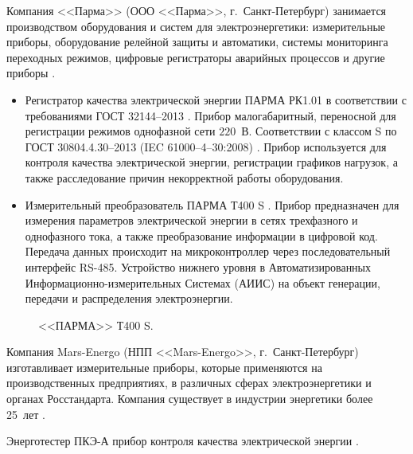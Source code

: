 Компания <<Парма>> (ООО <<Парма>>, г.~Санкт-Петербург) занимается производством оборудования и систем для электроэнергетики: измерительные приборы, оборудование релейной защиты и автоматики, системы мониторинга переходных режимов, цифровые регистраторы аварийных процессов и другие приборы \cite{parma}. 

\begin{itemize}
	\item Регистратор качества электрической энергии ПАРМА РК1.01 \cite{parma2} в соответствии с требованиями ГОСТ 32144–2013 \cite{GOST32144-2013}. 
	Прибор малогабаритный, переносной для регистрации режимов однофазной сети $220$~В. Соответствии с классом S по ГОСТ 30804.4.30–2013 (IEC 61000–4–30:2008) \cite{GOST30804.4.30-2013}. Прибор используется для контроля качества электрической энергии, регистрации графиков нагрузок, а также расследование причин некорректной работы оборудования.
	
	\item Измерительный преобразователь ПАРМА Т400 S \cite{parma1}.
	Прибор предназначен для измерения параметров электрической энергии в сетях трехфазного и однофазного тока, а также преобразование информации в цифровой код. Передача данных происходит на микроконтроллер через последовательный интерфейс RS-485. Устройство нижнего уровня в Автоматизированных Информационно-измерительных Системах (АИИС) на объект генерации, передачи и распределения электроэнергии.
\end{itemize}

\begin{figure}[ht]
	\caption{<<ПАРМА>> Т400 S.}\label{fig:picture9}
\end{figure}

Компания Mars-Energo (НПП <<Mars-Energo>>, г.~Санкт-Петербург) изготавливает измерительные приборы, которые применяются на производственных предприятиях, в различных сферах электроэнергетики и органах Росстандарта. Компания существует в индустрии энергетики более 25~лет \cite{Mars-Energo}.

Энерготестер ПКЭ-А прибор контроля качества электрической энергии \cite{energy_tester}.

